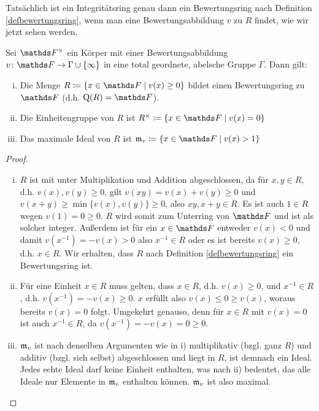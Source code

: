 \documentclass[ngerman,fontsize=11pt, paper=a4, parskip=half, titlepage=true, toc=bib]{scrartcl}
\begin{document}
Tatsächlich ist ein Integritätsring genau dann
ein Bewertungsring nach Definition \ref{defbewertungsring},
wenn man eine Bewertungsabbildung $v$ zu $R$ findet,
wie wir jetzt sehen werden.

\begin{Lem}\label{bewertungsringausbewertung}
  Sei $\Fx$ ein Körper mit einer Bewertungsabbildung
  $v\colon\F\to\Gamma\cup\{\infty\}$ in eine total geordnete, abelsche Gruppe
  $\Gamma$. Dann gilt:
  \begin{enumerate}[i)]
  \item   Die Menge $R\coloneqq\left\{x\in \F\mid  v(x)\geq 0\right\}$ bildet
    einen Bewertungsring zu $\F$ (d.h. $\Quot(R)=\F$).
  \item Die Einheitengruppe von $R$ ist 
    $R^\times\coloneqq\left\{x\in\F\mid v(x)=0\right\}$
  \item Das maximale Ideal von $R$ ist
    $\frakm_v\coloneqq\left\{x\in\F\mid v(x)>1\right\}$
  \end{enumerate}

  \begin{proof}
    \begin{enumerate}[i)]
    \item $R$ ist mit unter Multiplikation und Addition abgeschlossen, da für
      $x,y\in R$, d.h. $v(x),v(y)\geq 0$, 
      gilt $v(xy)=v(x)+v(y)\geq 0$ und 
      $v(x+y)\geq \min\{v(x),v(y)\}\geq 0$, also $xy, x+y\in R$.
      Es ist auch $1\in R$ wegen $v(1)=0\geq 0$.
      $R$ wird somit  zum Unterring von $\F$ und ist als solcher integer.
      Außerdem ist für ein $x\in \F$ entweder $v(x)<0$
      und damit $v(x^{-1})=-v(x)>0$ also $x^{-1}\in R$ oder es ist
      bereits $v(x)\geq 0$, d.h. $x\in R$.
      Wir erhalten, dass $R$ nach Definition \ref{defbewertungsring}
      ein Bewertungsring ist.
    \item Für eine Einheit $x\in R$ muss gelten, dass $x\in R$,
      d.h. $v(x)\geq 0$, und $x^{-1}\in R$, d.h. $v(x^{-1})=-v(x)\geq 0$. 
      $x$ erfüllt also $v(x)\leq 0 \geq v(x)$, woraus bereits $v(x)=0$
      folgt.
      Umgekehrt genauso, denn für $x\in R$ mit $v(x)=0$ ist auch
      $x^{-1}\in R$, da $v(x^{-1})=-v(x)=0\geq 0$.
    \item $\mathfrak{m}_v$ ist nach denselben Argumenten wie in i)
      multiplikativ (bzgl. ganz $R$) und additiv (bzgl. sich selbst)
      abgeschlossen und liegt in $R$, ist demnach ein Ideal.
      Jedes echte Ideal darf keine Einheit enthalten, was nach ii) bedeutet,
      das alle Ideale nur Elemente in $\mathfrak{m}_v$ enthalten
      können. $\mathfrak{m}_v$ ist also maximal.
    \end{enumerate}
  \end{proof}
\end{Lem}
\end{document}
